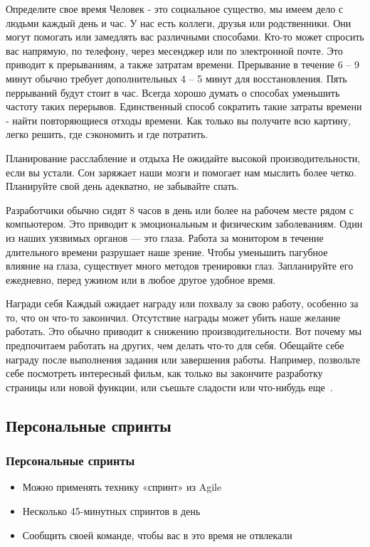 \documentclass{../industrial-development}
\begin{document}
Определите свое время
Человек - это социальное существо, мы имеем дело с людьми каждый день и час. У нас есть коллеги, друзья или родственники. Они могут помогать или замедлять вас различными способами. Кто-то может спросить вас напрямую, по телефону, через месенджер или по электронной почте. Это приводит к прерываниям, а также затратам времени. Прерывание в течение 6 -- 9 минут обычно требует дополнительных 4 -- 5 минут для восстановления. Пять перрываний будут стоит в час. Всегда хорошо думать о способах уменьшить частоту таких перерывов. Единственный способ сократить такие затраты времени - найти повторяющиеся отходы времени. Как только вы получите всю картину, легко решить, где сэкономить и где потратить.

Планирование расслабление и отдыха
Не ожидайте высокой производительности, если вы устали. Сон заряжает наши мозги и помогает нам мыслить более четко. Планируйте свой день адекватно, не забывайте спать.

Разработчики обычно сидят 8 часов в день или более на рабочем месте рядом с компьютером. Это приводит к эмоциональным и физическим заболеваниям. Один из наших уязвимых органов --- это глаза. Работа за монитором в течение длительного времени разрушает наше зрение. Чтобы уменьшить пагубное влияние на глаза, существует много методов тренировки глаз. Запланируйте его ежедневно, перед ужином или в любое другое удобное время.

Награди себя
Каждый ожидает награду или похвалу за свою работу, особенно за то, что он что-то законичил. Отсутствие награды может убить наше желание работать. Это обычно приводит к снижению производительности. Вот почему мы предпочитаем работать на других, чем делать что-то для себя. Обещайте себе награду после выполнения задания или завершения работы. Например, позвольте себе посмотреть интересный фильм, как только вы закончите разработку страницы или новой функции, или съешьте сладости или что-нибудь еще~\cite{TMCodeProject}.

\subsection{Персональные спринты}

\begin{frame} \frametitle{Персональные спринты}
  \begin{itemize}
  \item Можно применять технику «спринт» из Agile
  \item Несколько 45-минутных спринтов в день
  \item Сообщить своей команде, чтобы вас в это время не отвлекали
  \end{itemize}
\end{frame}
\end{document}
